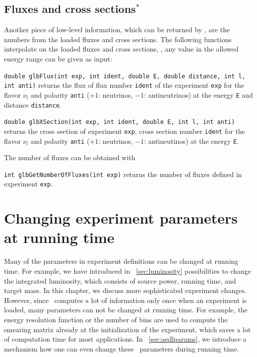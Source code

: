 \section{Fluxes and cross sections$^*$}
 

Another piece of low-level information, which can be returned by \GLOBES ,
are the numbers from the loaded fluxes and cross sections.
The following functions interpolate on the loaded fluxes and cross 
sections, \ie, any value in the allowed energy range can be given as input:
\begin{function}
{\tt double glbFlux(int exp, int ident, 
double E, double distance, int l, int anti)} returns
the flux of flux number {\tt ident} of the experiment {\tt exp}
for the flavor $\nu_l$ 
and polarity {\tt anti} ($+1$: neutrinos, $-1$: antineutrinos) at the energy {\tt E} and distance {\tt distance}.
\end{function}

\begin{function}
{\tt double glbXSection(int exp, 
int ident, double E, int l, int anti)} returns
the cross section of experiment {\tt exp}, 
cross section number {\tt ident} for the flavor $\nu_l$ and polarity {\tt anti} ($+1$: neutrinos, $-1$: antineutinos) at the energy {\tt E}.
\end{function}
%
The number of fluxes can be obtained with
\begin{function}
{\tt int glbGetNumberOfFluxes(int exp)} returns the number of 
fluxes defined in experiment {\tt exp}.
\end{function}



\chapter{Changing experiment parameters at running time}
\label{chapt:running}

Many of the parameters in experiment definitions can be changed
at running time. For example, we have introduced in 
\Sec~\ref{sec:luminosity} possibilities to change the integrated
luminosity, which consists of source power, running time, and target mass.
In this chapter, we discuss more sophisticated
experiment changes. However, since \GLOBES\ computes a lot of
information only once when an experiment is loaded, many
parameters can not be changed at running time. For example,
the energy resolution function or the number of bins are used
to compute the smearing matrix already at the initialization
of the experiment, which saves a lot of computation
time for most applications. In \Sec~\ref{sec:aedlparams}, we 
introduce a mechanism how one can even change these \AEDL\ parameters
during running time.



